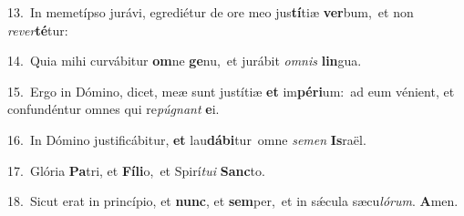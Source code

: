{\numbfont\textcolor{\numbcolor}{13.}}~In memetípso jurávi, egrediétur de ore meo jus\-\textbf{tí}\-tiæ \textbf{ver}\-bum,~\star et non \textit{re}\-\textit{ver}\textbf{té}tur:\par
{\numbfont\textcolor{\numbcolor}{14.}}~Quia mihi curvábitur \textbf{om}\-ne \textbf{ge}\-nu,~\star et jurábit \textit{om}\-\textit{nis} \textbf{lin}\-gua.\par
{\numbfont\textcolor{\numbcolor}{15.}}~Ergo in Dómino, dicet, meæ sunt justítiæ \textbf{et} im\-\textbf{pé}\-\textbf{ri}um:~\star ad eum vénient, et confundéntur omnes qui re\-\textit{pú}\-\textit{gnant} \textbf{e}\-i.\par
{\numbfont\textcolor{\numbcolor}{16.}}~In Dómino justificábitur, \textbf{et} lau\-\textbf{dá}\-\textbf{bi}tur~\star omne \textit{se}\-\textit{men} \textbf{Is}\-raël.\par
{\numbfont\textcolor{\numbcolor}{17.}}~Glória \textbf{Pa}\-tri, et \textbf{Fí}\-\textbf{li}o,~\star et Spirí\-\textit{tu}\-\textit{i} \textbf{Sanc}\-to.\par
{\numbfont\textcolor{\numbcolor}{18.}}~Sicut erat in princípio, et \textbf{nunc}\-, et \textbf{sem}\-per,~\star et in sǽcula sæcu\-\textit{ló}\-\textit{rum}. \textbf{A}\-men.\par
